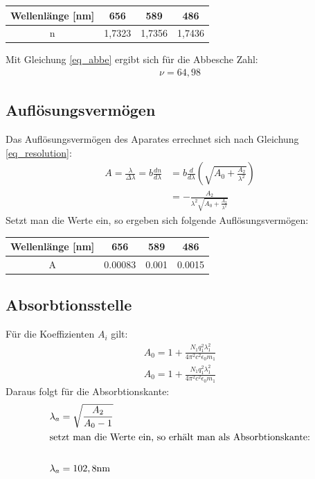 \begin{table}[H]
\begin{tabular}{c|c|c|c}
Wellenlänge [nm]&	656 &	589 &	486\\ \hline
n &	1,7323 &	1,7356 &	1,7436\\
\end{tabular} 
\end{table}

Mit Gleichung \eqref{eq_abbe} ergibt sich für die Abbesche Zahl:
\begin{align*}
\nu = 64,98
\end{align*}

\subsection{Auflösungsvermögen}
Das Auflösungsvermögen des Aparates errechnet sich nach Gleichung \eqref{eq_resolution}:
\begin{align*}
A = \frac{\lambda}{\Delta \lambda} = b\frac{dn}{d\lambda} &= b \frac{d}{d\lambda}\left(\sqrt{A_0 + \frac{A_2}{\lambda^2}}\right)\\
 &= -\frac{A_2}{\lambda^2\sqrt{A_0+\frac{A_2}{\lambda^2}}}
\end{align*}
Setzt man die Werte ein, so ergeben sich folgende Auflösungsvermögen:
\begin{table}[H]
\begin{tabular}{c|c|c|c}
Wellenlänge [nm]&	656 &	589 &	486\\ \hline
A &	0.00083 & 0.001 & 0.0015\\
\end{tabular} 
\end{table}
\subsection{Absorbtionsstelle}
Für die Koeffizienten $A_i$ gilt:
\begin{align*}
A_0=1+\frac{N_1q^2_1\lambda^2_1}{4\pi^2c^2\epsilon_0m_1}\\
A_0=1+\frac{N_1q^2_1\lambda^2_1}{4\pi^2c^2\epsilon_0m_1}
\end{align*}
Daraus folgt für die Absorbtionskante:
\begin{align*}
\lambda_a&=\sqrt{\frac{A_2}{A_0-1}}\\
\intertext{setzt man die Werte ein, so erhält man als Absorbtionskante:}\\
\lambda_a&=102,8\text{nm}
\end{align*}
